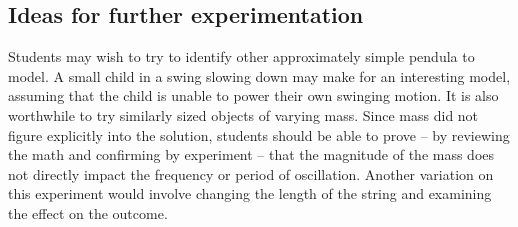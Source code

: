 \documentclass{ximera}
\begin{document}
\subsection*{Ideas for further experimentation}
Students may wish to try to identify other approximately simple pendula to model.  A small child in a swing slowing down may make for an interesting model, assuming that the child is unable to power their own swinging motion.  It is also worthwhile to try similarly sized objects of varying mass.  Since mass did not figure explicitly into the solution, students should be able to prove – by reviewing the math and confirming by experiment – that the magnitude of the mass does not directly impact the frequency or period of oscillation.  Another variation on this experiment would involve changing the length of the string and examining the effect on the outcome.
\end{document}
